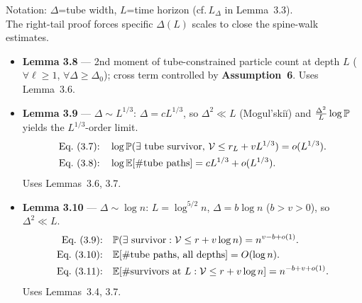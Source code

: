 \small
{\color{red!70!black} Notation: $\Delta$=tube width, $L$=time horizon (cf.\,$L_\Delta$ in Lemma~3.3).\\
The right-tail proof forces specific $\Delta(L)$ scales to close the spine-walk estimates.}

\medskip
\begin{itemize}
    \item \textbf{Lemma 3.8} --- 2nd moment of tube-constrained particle count at depth $L$ ($\forall\ell\ge1$, $\forall\Delta\ge\Delta_0$); cross term controlled by \textbf{Assumption~6}.
    {\color{blue!60!black} Uses Lemma~3.6.}

    \item \textbf{Lemma 3.9} --- $\Delta\sim L^{1/3}$: $\Delta=cL^{1/3}$, so $\Delta^2\ll L$ (Mogul'ski\u{i}) and $\frac{\Delta^2}{L}\log\P$ yields the $L^{1/3}$-order limit.
    \begin{align*}
        \text{Eq.~(3.7):}&\quad
        \log\P(\exists\text{ tube survivor},\,\mathcal V\le r_L+vL^{1/3})=o(L^{1/3}).\\
        \text{Eq.~(3.8):}&\quad
        \log\E[\#\text{tube paths}]=cL^{1/3}+o(L^{1/3}).
    \end{align*}
    {\color{blue!60!black} Uses Lemmas~3.6, 3.7.}

    \item \textbf{Lemma 3.10} --- $\Delta\sim\log n$: $L=\log^{5/2}n$, $\Delta=b\log n$ ($b>v>0$), so $\Delta^2\ll L$.
    \begin{align*}
        \text{Eq.~(3.9):}&\quad
        \P(\exists\text{ survivor}:\mathcal V\le r+v\log n)=n^{v-b+o(1)}.\\
        \text{Eq.~(3.10):}&\quad
        \E[\#\text{tube paths, all depths}]=O(\log n).\\
        \text{Eq.~(3.11):}&\quad
        \E[\#\text{survivors at }L:\mathcal V\le r+v\log n]=n^{-b+v+o(1)}.
    \end{align*}
    {\color{blue!60!black} Uses Lemmas~3.4, 3.7.}
\end{itemize}
